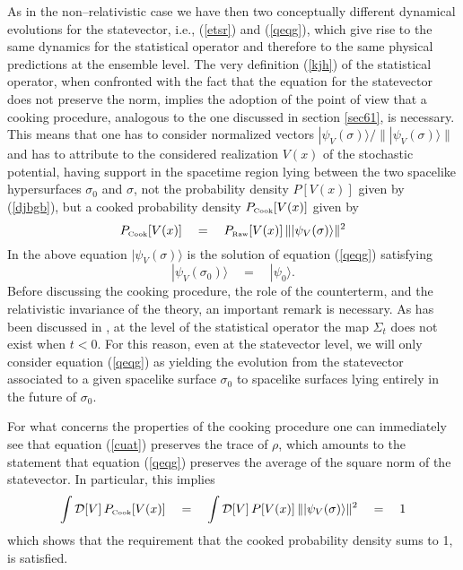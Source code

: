 \documentclass[10pt,a4paper]{article}
\begin{document}
As in the non--relativistic case we have then two conceptually
different dynamical evolutions for the statevector, i.e.,
(\ref{etsr}) and (\ref{qeqg}), which give rise to the same
dynamics for the statistical operator and therefore to the same
physical predictions at the ensemble level. The very definition
(\ref{kjh}) of the statistical operator, when confronted with the
fact that the equation for the statevector does not preserve the
norm, implies the adoption of the point of view that a cooking
procedure, analogous to the one discussed in section \ref{sec61},
is necessary. This means that one has to consider normalized
vectors $|\psi_{V}(\sigma)\rangle/\| |\psi_{V}(\sigma)\rangle\|$
and has to attribute to the considered realization $V(x)$ of the
stochastic potential, having support in the spacetime region lying
between the two spacelike hypersurfaces $\sigma_{0}$ and $\sigma$,
not the probability density $P[V(x)]$ given by (\ref{djbgb}), but
a cooked probability density $P_{\makebox{\tiny Cook}}[V(x)]$
given by
\begin{equation}
P_{\makebox{\tiny Cook}}[V(x)] \quad = \quad P_{\makebox{\tiny
Raw}}[V(x)]\, \|  |\psi_{V}(\sigma)\rangle\|^{2}
\end{equation}
In the above equation $|\psi_{V}(\sigma)\rangle$ is the solution
of equation  (\ref{qeqg}) satisfying
\begin{equation}
|\psi_{V}(\sigma_{0})\rangle \quad = \quad |\psi_{0}\rangle.
\end{equation}
Before discussing the cooking procedure, the role of the
counterterm, and the relativistic invariance of the theory, an
important remark is necessary. As  has been discussed in
\cite{rel}, at the level of the statistical operator the map
$\Sigma_{t}$ does not exist when $t < 0$. For this reason, even at
the statevector level, we will only consider equation (\ref{qeqg})
as yielding the evolution from the statevector associated to a
given spacelike surface $\sigma_{0}$ to spacelike surfaces lying
entirely in the future of $\sigma_{0}$.

For what concerns the properties of the cooking procedure one can
immediately see that equation (\ref{cuat}) preserves the trace of
$\rho$,  which amounts to the statement that equation (\ref{qeqg})
preserves the average of the square norm of the statevector. In
particular, this implies
\begin{equation}
\int {\mathcal D}[V]\, P_{\makebox{\tiny Cook}}[V(x)] \quad =
\quad \int {\mathcal D}[V]\, P[V(x)] \, \|
|\psi_{V}(\sigma)\rangle \|^{2} \quad = \quad 1
\end{equation}
which shows that the requirement that the cooked probability
density sums to 1, is satisfied.
\end{document}
